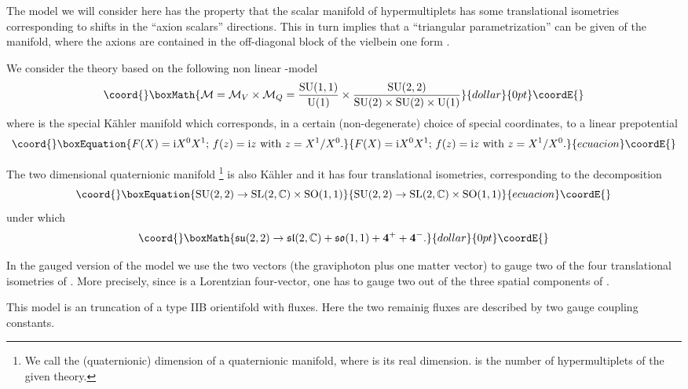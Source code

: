 \documentclass[a4paper,12pt]{article}
\begin{document}
The model we will consider here has the  property that the scalar manifold of hypermultiplets has some translational isometries 
corresponding to shifts in the ``axion scalars'' directions.
This in turn implies that a ``triangular parametrization'' can be given of the manifold, where the axions are 
contained in the off-diagonal block of the vielbein one form \cite{fgp,tz,zino}.

We consider the \coordHE{} theory based on the following non linear \myHighlight{$\sigma$}\coordHE{}-model
$$\coord{}\boxMath{{\mathcal M} = {\mathcal M}_V \times {\mathcal M}_Q = \frac{\rSU(1,1)}{\rU(1)} \times \frac{\rSU(2,2)}{\rSU(2)\times \rSU(2)\times
 \rU(1)}}{dollar}{0pt}\coordE{}$$
where \coordHE{} is the special K\"ahler manifold which corresponds, in a certain (non-degenerate) choice
of special coordinates, to a linear prepotential 
\begin{equation}\coord{}\boxEquation{
F(X) = \ii X^0X^1; \, f(z) = \ii z \mbox{ with } z = X^1/X^0 .
\label{standard}
}{
F(X) = \ii X^0X^1; \, f(z) = \ii z \mbox{ with } z = X^1/X^0 .
}{ecuacion}\coordE{}\end{equation}

The two dimensional quaternionic manifold \coordHE{} 
\footnote{We call \coordHE{} the (quaternionic) dimension of a quaternionic manifold, where \coordHE{} is its real dimension.
\coordHE{} is the number of hypermultiplets of the given \coordHE{} theory.}
 is also K\"ahler and it has four translational isometries, corresponding 
to the decomposition
\begin{equation}\coord{}\boxEquation{
 \rSU(2,2) \to \rSL(2,\C) \times\rSO(1,1) \label{decomp}
}{
 \rSU(2,2) \to \rSL(2,\C) \times\rSO(1,1) }{ecuacion}\coordE{}\end{equation}
under which 
$$\coord{}\boxMath{ \fsu(2,2) \to \fsl(2,\C) +\fso(1,1) + {\bf 4}^++ {\bf 4}^-.}{dollar}{0pt}\coordE{}$$ 

In the gauged version of the model we use the two vectors (the graviphoton plus one matter vector) to  gauge two of
the four  translational isometries \coordHE{} of \coordHE{}. More precisely, since \coordHE{} is a Lorentzian four-vector, one
has to gauge two out of the three spatial components of \coordHE{}.

This model is an \coordHE{} truncation \cite{adfl2,adfl3} of a type IIB 
\coordHE{} orientifold with fluxes. 
Here the two remainig fluxes are described by two gauge coupling constants.
\end{document}
